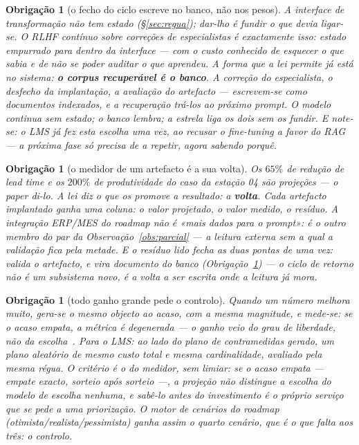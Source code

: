 \documentclass[11pt,a4paper]{article}
\newtheorem{obrigacao}[teorema]{Obrigação}
\begin{document}
\begin{obrigacao}[o fecho do ciclo escreve no banco, não nos pesos]\label{ob:banco}
A interface de transformação não tem estado (\S\ref{sec:regua}); dar-lho é fundir o que devia
ligar-se. O RLHF contínuo sobre correções de especialistas é exactamente isso: estado empurrado para
dentro da interface --- com o custo conhecido de esquecer o que sabia e de não se poder auditar o que
aprendeu. A forma que a lei permite já está no sistema: \textbf{o corpus recuperável é o banco}. A
correção do especialista, o desfecho da implantação, a avaliação do artefacto --- escrevem-se como
documentos indexados, e a recuperação trá-los ao próximo prompt. O modelo continua sem estado; o banco
lembra; a estrela liga os dois sem os fundir. E note-se: o LMS \emph{já} fez esta escolha uma vez, ao
recusar o fine-tuning a favor do RAG~\cite{lms} --- a próxima fase só precisa de a repetir, agora
sabendo porquê.
\end{obrigacao}

\begin{obrigacao}[o medidor de um artefacto é a sua volta]\label{ob:residuo}
Os $65\%$ de redução de lead time e os $200\%$ de produtividade do caso da estação 04 são
\emph{projeções} --- o paper di-lo. A lei diz o que os promove a resultado: a \textbf{volta}. Cada
artefacto implantado ganha uma coluna: o valor projetado, o valor medido, o resíduo. A integração
ERP/MES do roadmap não é «mais dados para o prompt»: é \emph{o outro membro do par} da
Observação~\ref{obs:parcial} --- a leitura externa sem a qual a validação fica pela metade. E o resíduo
lido fecha as duas pontas de uma vez: valida o artefacto, e vira documento do banco
(Obrigação~\ref{ob:banco}) --- o ciclo de retorno não é um subsistema novo, é a volta a ser escrita
onde a leitura já mora.
\end{obrigacao}

\begin{obrigacao}[todo ganho grande pede o controlo]\label{ob:controlo}
Quando um número melhora muito, gera-se \emph{o mesmo objecto ao acaso, com a mesma magnitude}, e
mede-se: se o acaso empata, a métrica é degenerada --- o ganho veio do grau de liberdade, não da
escolha~\cite{teoria}. Para o LMS: ao lado do plano de contramedidas gerado, um plano \emph{aleatório}
de mesmo custo total e mesma cardinalidade, avaliado pela mesma régua. O critério é o do medidor, sem
limiar: se o acaso \emph{empata} --- empate exacto, sorteio após sorteio ---, a projeção não distingue
a escolha do modelo de escolha nenhuma, e sabê-lo \emph{antes} do investimento é o próprio serviço que
se pede a uma priorização. O motor de cenários do roadmap
(otimista/realista/pessimista) ganha assim o quarto cenário, que é o que falta aos três: o controlo.
\end{obrigacao}
\end{document}
